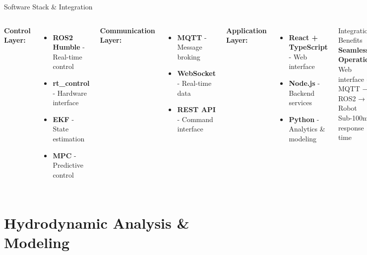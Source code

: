 \documentclass[aspectratio=169]{beamer}
\begin{document}
\begin{frame}{Software Stack \& Integration}
\begin{columns}[T]
\textbf{Control Layer:}
\begin{itemize}
    \item \textbf{ROS2 Humble} - Real-time control
    \item \textbf{rt\_control} - Hardware interface
    \item \textbf{EKF} - State estimation
    \item \textbf{MPC} - Predictive control
\end{itemize}

\textbf{Communication Layer:}
\begin{itemize}
    \item \textbf{MQTT} - Message broking
    \item \textbf{WebSocket} - Real-time data
    \item \textbf{REST API} - Command interface
\end{itemize}

\textbf{Application Layer:}
\begin{itemize}
    \item \textbf{React + TypeScript} - Web interface
    \item \textbf{Node.js} - Backend services
    \item \textbf{Python} - Analytics \& modeling
\end{itemize}

\begin{block}{Integration Benefits}
\textbf{Seamless Operation:}\\
Web interface → MQTT → ROS2 → Robot\\
Sub-100ms response time
\end{block}
\end{columns}
\end{frame}

\section{Hydrodynamic Analysis \& Modeling}
\end{document}
